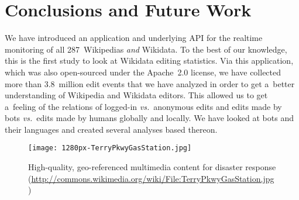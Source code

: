 \documentclass{sig-alternate}
\newcommand{\inlinelistingsize}{\fontsize{8pt}{11pt}}
\let\oldurl\url
\renewcommand{\url}[1]{\inlinelistingsize\oldurl{#1}}
\begin{document}
\section{Conclusions and Future Work}

We have introduced an application
and underlying API for the realtime monitoring
of all 287~Wikipedias \emph{and} Wikidata.
To the best of our knowledge,
this is the first study to look at Wikidata editing statistics.
Via this application, which was also open-sourced under the Apache~2.0 license,
we have collected more than 3.8~million edit events
that we have analyzed in order to get a~better understanding
of Wikipedia and Wikidata editors.
This allowed us to get a~feeling of the relations of
logged-in \emph{vs.}\ anonymous edits
and edits made by bots \emph{vs.}\ edits made by humans
globally and locally.
We have looked at bots and their languages
and created several analyses based thereon.

\begin{figure}[t!]
  \centering
  \texttt{[image: 1280px-TerryPkwyGasStation.jpg]}
  \caption{High-quality, geo-referenced multimedia content
  for disaster response (\url{http://commons.wikimedia.org/wiki/File:TerryPkwyGasStation.jpg})}
  \label{fig:terry}  
\end{figure}
\end{document}
